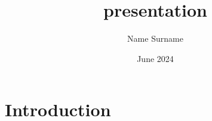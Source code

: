 \documentclass{article}
\title{presentation}
\author{Name Surname}
\date{June 2024}
\begin{document}
\maketitle

\section{Introduction}
\end{document}
